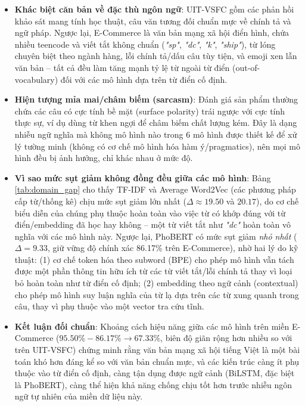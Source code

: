 \documentclass[12pt,a4paper]{article}
\begin{document}
\begin{itemize}[leftmargin=1.0cm, itemsep=2pt]
    \item[--] \textbf{Khác biệt căn bản về đặc thù ngôn ngữ}: UIT-VSFC gồm các phản hồi khảo sát mang tính học thuật, câu văn tương đối chuẩn mực về chính tả và ngữ pháp. Ngược lại, E-Commerce là văn bản mạng xã hội điển hình, chứa nhiều teencode và viết tắt không chuẩn (\textit{"sp"}, \textit{"dc"}, \textit{"k"}, \textit{"ship"}), từ lóng chuyên biệt theo ngành hàng, lỗi chính tả/dấu câu tùy tiện, và emoji xen lẫn văn bản -- tất cả đều làm tăng mạnh tỷ lệ từ ngoài từ điển (out-of-vocabulary) đối với các mô hình dựa trên từ điển cố định.
    \item[--] \textbf{Hiện tượng mỉa mai/châm biếm (sarcasm)}: Đánh giá sản phẩm thường chứa các câu có cực tính bề mặt (surface polarity) trái ngược với cực tính thực sự, ví dụ dùng từ khen ngợi để châm biếm chất lượng kém. Đây là dạng nhiễu ngữ nghĩa mà không mô hình nào trong 6 mô hình được thiết kế để xử lý tường minh (không có cơ chế mô hình hóa hàm ý/pragmatics), nên mọi mô hình đều bị ảnh hưởng, chỉ khác nhau ở mức độ.
    \item[--] \textbf{Vì sao mức sụt giảm không đồng đều giữa các mô hình}: Bảng \ref{tab:domain_gap} cho thấy TF-IDF và Average Word2Vec (các phương pháp cấp từ/thống kê) chịu mức sụt giảm lớn nhất ($\Delta \approx 19.50$ và $20.17$), do cơ chế biểu diễn của chúng phụ thuộc hoàn toàn vào việc từ có khớp đúng với từ điển/embedding đã học hay không -- một từ viết tắt như \textit{"dc"} hoàn toàn vô nghĩa với các mô hình này. Ngược lại, PhoBERT có mức sụt giảm \textit{nhỏ nhất} ($\Delta = 9.33$, giữ vững độ chính xác 86.17\% trên E-Commerce), nhờ hai lý do kỹ thuật: (1) cơ chế token hóa theo subword (BPE) cho phép mô hình vẫn tách được một phần thông tin hữu ích từ các từ viết tắt/lỗi chính tả thay vì loại bỏ hoàn toàn như từ điển cố định; (2) embedding theo ngữ cảnh (contextual) cho phép mô hình suy luận nghĩa của từ lạ dựa trên các từ xung quanh trong câu, thay vì phụ thuộc vào một vector tra cứu tĩnh.
    \item[--] \textbf{Kết luận đối chuẩn}: Khoảng cách hiệu năng giữa các mô hình trên miền E-Commerce ($95.50\% - 86.17\% \to 67.33\%$, biên độ giãn rộng hơn nhiều so với trên UIT-VSFC) chứng minh rằng văn bản mạng xã hội tiếng Việt là một bài toán khó hơn đáng kể so với văn bản chuẩn mực, và các kiến trúc càng ít phụ thuộc vào từ điển cố định, càng tận dụng được ngữ cảnh (BiLSTM, đặc biệt là PhoBERT), càng thể hiện khả năng chống chịu tốt hơn trước nhiễu ngôn ngữ tự nhiên của miền dữ liệu này.
\end{itemize}
\end{document}
